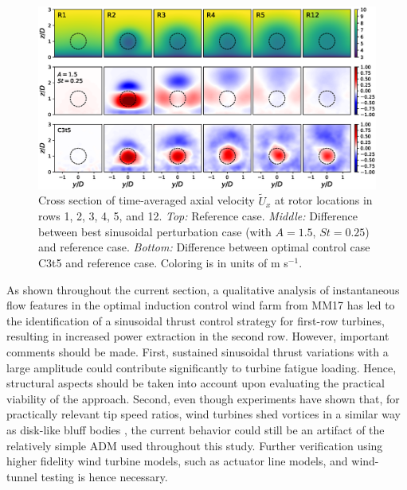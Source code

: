 \documentclass[wes, manuscript]{copernicus}
\begin{document}
\begin{figure}
	\centering
	\includegraphics[width=\textwidth]{figure20}
	\caption{Cross section of time-averaged axial velocity $\widetilde{U}_x$ at rotor locations in rows 1, 2, 3, 4, 5, and 12. \emph{Top: } Reference case. \emph{Middle: } Difference between best sinusoidal perturbation case (with $A = 1.5$, $St = 0.25$) and reference case. \emph{Bottom: } Difference between optimal control case C3t5 and reference case. Coloring is in units of m s$^{-1}$. \label{fig:cross_section_sinus}}
\end{figure}

As shown throughout the current section, a qualitative analysis of instantaneous flow features in the optimal induction control wind farm from MM17 has led to the identification of a sinusoidal thrust control strategy for first-row turbines, resulting in increased power extraction in the second row. However, important comments should be made. First, sustained sinusoidal thrust variations with a large amplitude could contribute significantly to turbine fatigue loading. Hence, structural aspects should be taken into account upon evaluating the practical viability of the approach. Second, even though experiments have shown that, for practically relevant tip speed ratios, wind turbines shed vortices in a similar way as disk-like bluff bodies \citep{medici2006measurements}, the current behavior could still be an artifact of the relatively simple ADM used throughout this study. Further verification using higher fidelity wind turbine models, such as actuator line models, and wind-tunnel testing is hence necessary. 
\end{document}
